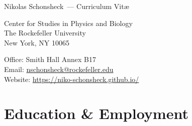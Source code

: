 \documentclass[10pt,letterpaper]{article}
\def\name{Nikolas Schonsheck}
\begin{document}
{\huge \name ~--- Curriculum Vit\ae}


\bigskip

\begin{minipage}[t]{0.5\textwidth}
  Center for Studies in Physics and Biology \\
  The Rockefeller University \\
  New York, NY 10065
\end{minipage} \hfill
\begin{minipage}[t]{0.5\textwidth}
  Office: Smith Hall Annex B17 \\
  Email: \url{nschonsheck@rockefeller.edu} \\
  Website:
  \href{https://niko-schonsheck.github.io/}{https://niko-schonsheck.github.io/}
\end{minipage}



\section*{Education \& Employment}
\end{document}
